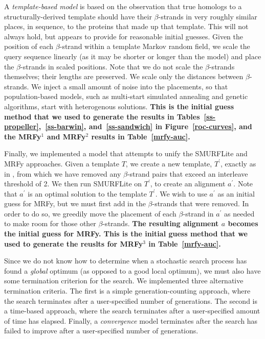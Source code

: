 \documentclass[blockstyle,times,preprint]{sigplanconf}
\begin{document}
A \emph{template-based model} is based on the observation 
that true homologs
to a structurally-derived template should have their $\beta$-strands in very
roughly similar places, in sequence, to the proteins that made up that
template.
This will not always hold, but appears to provide for reasonable initial
guesses.
Given the position of each $\beta$-strand within a template Markov random 
field, we scale the query sequence linearly (as it may be shorter or longer 
than the model) and place the $\beta$-strands in scaled positions.
Note that we do not scale the $\beta$-strands themselves; their lengths are
preserved.
We scale only the distances between $\beta$-strands.
We inject a small amount of noise into the placements, so that 
population-based models, such as multi-start simulated annealing and genetic
algorithms, start with heterogenous solutions.
\textbf{This is the initial guess method that we used to generate
the results in Tables~\ref{ss-propeller},~\ref{ss-barwin}, 
and~\ref{ss-sandwich} in Figure~\ref{roc-curves}, and the MRFy$^1$ and MRFy$^2$ 
results in Table~\ref{mrfy-auc}.}

  
Finally, we implemented a model that attempts to unify the SMURFLite and
MRFy approaches.
Given a template $T$, we create a new template, $T^\prime$, exactly as in
\citet{Daniels:2012dg}, from which we have removed any $\beta$-strand pairs
that exceed an interleave threshold of 2.
We then run SMURFLite on $T^\prime$, to create an alignment $a^\prime$.
Note that $a^\prime$ is an optimal solution to the template $T^\prime$.
We wish to use $a^\prime$ as an initial guess for MRFy, but we must first add
in the $\beta$-strands that were removed.
In order to do so, we greedily move the placement of each $\beta$-strand in
$a^\prime$ as needed to make room for those other $\beta$-strands.
\textbf{The resulting alignment $a$ becomes the initial guess for MRFy.
This is the initial guess method that we used to generate
the reuslts for MRFy$^3$ in Table~\ref{mrfy-auc}.}



Since we do not know how to determine when a stochastic search process has found
a \emph{global} optimum (as opposed to a good local optimum), we must also have
some termination criterion for the search.
We implemented three alternative termination criteria. The first is a simple 
generation-counting approach, where the search terminates after
a user-specified number of generations.
The second is a time-based approach, where the search terminates after a 
user-specified amount of time has elapsed.
Finally, a \emph{convergence} model terminates after the search
has failed to improve after a user-specified number of generations.
  
\end{document}
